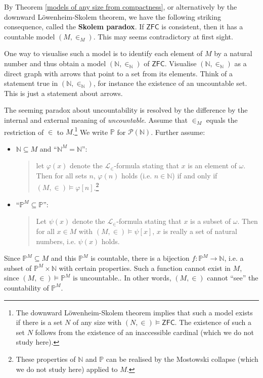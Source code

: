 \documentclass[a4paper, 11pt]{amsart}
\theoremstyle{remark}
\newcommand{\axiomft}[1]{\mathsf{#1}}
\newcommand{\ZFC}{\axiomft{ZFC}}
\newcommand{\NN}{\mathbb{N}}
\newcommand{\PP}{\mathbb{P}}
\newcommand{\cL}{\mathcal L}
\begin{document}
By Theorem \ref{models of any size from compactness}, or alternatively by the downward L\"owenheim-Skolem theorem, we have the following striking consequence, called the {\bf Skolem paradox}. 
If $\ZFC$ is consistent, then it has a countable model $(M,\in_M)$. 
This may seems contradictory at first sight. 

One way to visualise such a model is to identify each element of $M$ by a natural number and thus obtain a model $(\NN,\in_\NN)$ of $\ZFC$. 
Visualise $(\NN,\in_\NN)$ as a direct graph with arrows that point to a set from its elements. 
Think of a statement true in $(\NN,\in_\NN)$, for instance the existence of an uncountable set. 
This is just a statement about arrows. 

The seeming paradox about uncountability is resolved by the difference by the internal and external meaning of \emph{uncountable}. 
Assume that $\in_M$ equals the restriction of $\in$ to $M$.\footnote{The downward L\"owenheim-Skolem theorem implies that such a model exists if there is a set $N$ of any size with $(N,\in)\models \ZFC$. 
The existence of such a set $N$ follows from the existence of an inaccessible cardinal (which we do not study here).} 
We write $\PP$ for $\mathcal{P}(\NN)$. 
Further assume: 
\begin{itemize} 
\item 
$\NN\subseteq M$ and ``$\NN^M=\NN$'': 
\begin{quote} 
 let $\varphi(x)$ denote the $\cL_\in$-formula stating that $x$ is an element of $\omega$. 
Then for all sets $n$, $\varphi(n)$ holds (i.e. $n\in\NN$) if and only if $(M,\in)\models \varphi [n]$.\footnote{These properties of $\NN$ and $\PP$ can be realised by the Mostowski collapse (which we do not study here) applied to $M$.} 
\end{quote} 
\item 
``$\PP^M\subseteq \PP$'': 
\begin{quote} 
Let $\psi(x)$ denote the $\cL_\in$-formula stating that $x$ is a subset of $\omega$. 
Then for all $x\in M$ with $(M,\in)\models \psi [x]$, $x$ is really a set of natural numbers, i.e. $\psi(x)$ holds. 
\end{quote} 
\end{itemize} 
Since $\PP^M \subseteq M$ and this $\PP^M$ is countable, 
there is a bijection $f\colon \PP^M\rightarrow \NN$, i.e. a subset of $\PP^M \times \NN$ with certain properties. 
Such a function cannot exist in $M$, since $(M,\in)\models \PP^M \text{ is uncountable}.$. 
In other words, $(M,\in)$ cannot ``see'' the countability of $\PP^M$. 
\end{document}
